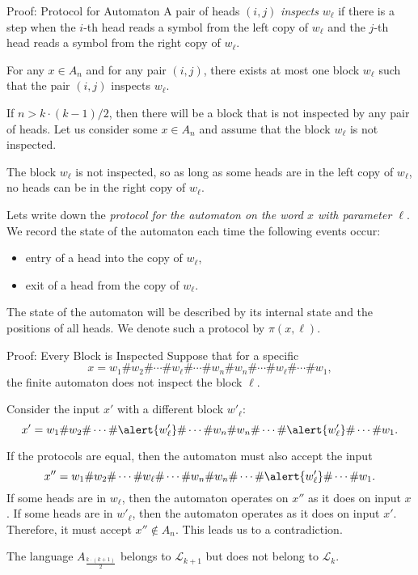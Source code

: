 \documentclass[aspectratio=169]{beamer}
\begin{document}
\begin{frame}{Proof: Protocol for Automaton}
    A pair of heads $(i,j)$ \emph{inspects} $w_\ell$ if there is a step when the $i$-th head reads a symbol from the left copy of $w_\ell$ and the $j$-th head reads a symbol from the right copy of $w_\ell$.\medskip\pause

    For any $x \in A_n$ and for any pair $(i,j)$, there exists at most one block $w_\ell$ such that the pair $(i,j)$ inspects $w_\ell$. \medskip\pause

    If $n > k \cdot (k-1)/2$, then there will be a block that is not inspected by any pair of heads. Let us consider some $x \in A_n$ and assume that the block $w_\ell$ is not inspected.\medskip\pause

    The block $w_\ell$ is not inspected, so as long as some heads are in the left copy of $w_\ell$, no heads can be in the right copy of $w_\ell$.\medskip\pause

    Lets write down the \emph{protocol for the automaton on the word $x$ with parameter $\ell$}.\\
    We record the state of the automaton each time the following events occur:
    \begin{itemize}
        \item entry of a head into the copy of $w_\ell$,
        \item exit of a head from the copy of $w_\ell$.
    \end{itemize}
    The state of the automaton will be described by its internal state and the positions of all heads. We denote such a protocol by $\pi(x,\ell)$.

\end{frame}

\begin{frame}{Proof: Every Block is Inspected}
    Suppose that for a specific
\[
    x = w_1\#w_2\#\dotsb\#w_\ell\#\dotsb\#w_n\#w_n\#\dotsb\#w_\ell\#\dotsb\#w_1,
\]
the finite automaton does not inspect the block $\ell$.

Consider the input $x'$ with a different block $w'_\ell$:
\[
x' = w_1\#w_2\#\dotsb\#\alert{w'_\ell}\#\dotsb\#w_n\#w_n\#\dotsb\#\alert{w'_\ell}\#\dotsb\#w_1.
\]

If the protocols are equal, then the automaton must also accept the input
\[
x'' = w_1\#w_2\#\dotsb\#w_\ell\#\dotsb\#w_n\#w_n\#\dotsb\#\alert{w'_\ell}\#\dotsb\#w_1.
\]
If some heads are in $w_\ell$, then the automaton operates on $x''$ as it does on input $x$. If some heads are in $w'_\ell$, then the automaton operates as it does on input $x'$. Therefore, it must accept $x'' \not\in A_n$. This leads us to a contradiction.\medskip

    The language $A_{\frac{k \cdot (k + 1)}{2}}$ belongs to $\mathcal{L}_{k+1}$ but does not belong to $\mathcal{L}_k$.
\end{frame}
\end{document}
